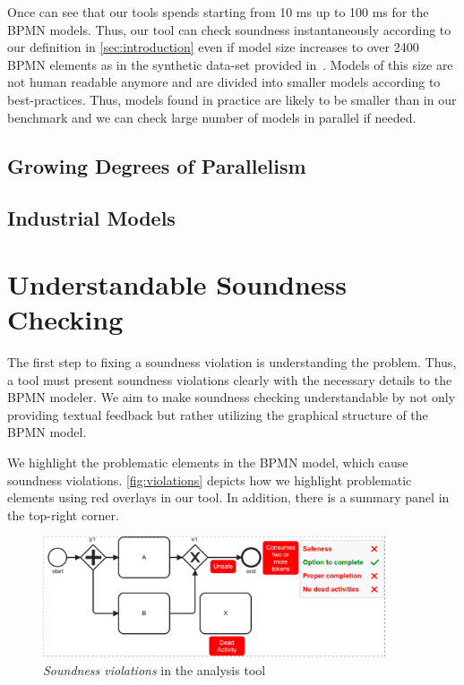 \documentclass[runningheads]{llncs}
\begin{document}
Once can see that our tools spends starting from 10 ms up to 100 ms for the BPMN models.
Thus, our tool can check soundness instantaneously according to our definition in \autoref{sec:introduction} even if model size increases to over 2400 BPMN elements as in the synthetic data-set provided in~\cite{krauterHigherorderTransformationApproach2023}.
Models of this size are not human readable anymore and are divided into smaller models according to best-practices.
Thus, models found in practice are likely to be smaller than in our benchmark and we can check large number of models in parallel if needed.

\subsection{Growing Degrees of Parallelism} \label{subsec:degrees-of-parallelism}

\subsection{Industrial Models} \label{subsec:industrial-models}


\section{Understandable Soundness Checking}

The first step to fixing a soundness violation is understanding the problem.
Thus, a tool must present soundness violations clearly with the necessary details to the BPMN modeler.
We aim to make soundness checking understandable by not only providing textual feedback but rather utilizing the graphical structure of the BPMN model.

We highlight the problematic elements in the BPMN model, which cause soundness violations.
\autoref{fig:violations} depicts how we highlight problematic elements using red overlays in our tool.
In addition, there is a summary panel in the top-right corner.

\begin{figure}[ht]
	\centering
	\includegraphics[width=0.9\textwidth]{images/violations}
	\caption{\textit{Soundness violations} in the analysis tool}
	\label{fig:violations}
\end{figure}
\end{document}
